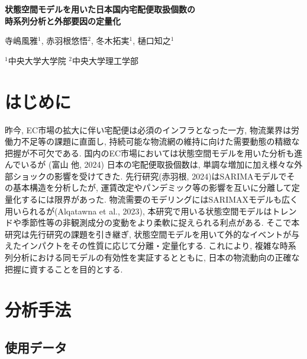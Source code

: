 \documentclass[a4paper, 10pt]{jarticle}
\begin{document}
\begin{center}
  \bfseries 
  {\huge 状態空間モデルを用いた日本国内宅配便取扱個数の\\時系列分析と外部要因の定量化} 
  \vspace{3ex} %

  寺嶋風雅$^{1}$, 赤羽根悠悟$^{2}$, 冬木拓実$^{1}$, 樋口知之$^{1}$
  \vspace{1.5ex} %

  {\small 
    $^{1}$中央大学大学院 \quad 
    $^{2}$中央大学理工学部 \quad 
  }
\end{center}

\section{はじめに} 
\titlespacing*{\section}{0pt}{1.0ex}{0.8ex}
昨今, EC市場の拡大に伴い宅配便は必須のインフラとなった一方, 
物流業界は労働力不足等の課題に直面し, 持続可能な物流網の維持に向けた需要動態の精緻な把握が不可欠である. 
国内のEC市場においては状態空間モデルを用いた分析も進んでいるが (富山 他, 2024)
日本の宅配便取扱個数は, 単調な増加に加え様々な外部ショックの影響を受けてきた. 
先行研究(赤羽根, 2024)はSARIMAモデルでその基本構造を分析したが, 運賃改定やパンデミック等の影響を互いに分離して定量化するには限界があった. 
物流需要のモデリングにはSARIMAXモデルも広く用いられるが(Alqatawna et al., 2023), 
本研究で用いる状態空間モデルはトレンドや季節性等の非観測成分の変動をより柔軟に捉えられる利点がある. 
そこで本研究は先行研究の課題を引き継ぎ, 状態空間モデルを用いて外的なイベントが与えたインパクトをその性質に応じて分離・定量化する. 
これにより, 複雑な時系列分析における同モデルの有効性を実証するとともに, 日本の物流動向の正確な把握に資することを目的とする.
\section{分析手法} 
\titlespacing*{\section}{0pt}{1.0ex}{0.8ex}
\subsection{使用データ} 
\titlespacing*{\subsection}{0pt}{0.8ex}{0.7ex}
\end{document}
